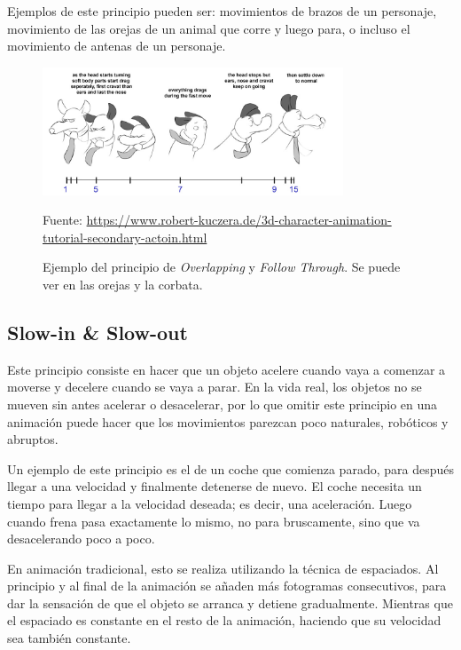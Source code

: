 \documentclass{article}
\begin{document}
\bigskip

Ejemplos de este principio pueden ser: movimientos de brazos de un personaje, movimiento de las orejas de un animal que corre y luego para, o incluso el movimiento de antenas de un personaje.

\begin{figure}[H]
    \centering
    \includegraphics[width=0.8\textwidth]{imagenes/overlap-08.jpg}
    \caption{Ejemplo del principio de \textit{Overlapping} y \textit{Follow Through}. Se puede ver en las orejas y la corbata.}
    \vspace{10pt}
    \footnotesize{Fuente: \url{https://www.robert-kuczera.de/3d-character-animation-tutorial-secondary-actoin.html}}
\end{figure}

\subsection{Slow-in \& Slow-out}

Este principio consiste en hacer que un objeto acelere cuando vaya a comenzar a moverse y decelere cuando se vaya a parar. En la vida real, los objetos no se mueven sin antes acelerar o desacelerar, por lo que omitir este principio en una animación puede hacer que los movimientos parezcan poco naturales, robóticos y abruptos. \cite{plural}

\bigskip

Un ejemplo de este principio es el de un coche que comienza parado, para después llegar a una velocidad y finalmente detenerse de nuevo. El coche necesita un tiempo para llegar a la velocidad deseada; es decir, una aceleración. Luego cuando frena pasa exactamente lo mismo, no para bruscamente, sino que va desacelerando poco a poco. \cite{plural}

\bigskip

En animación tradicional, esto se realiza utilizando la técnica de espaciados. Al principio y al final de la animación se añaden más fotogramas consecutivos, para dar la sensación de que el objeto se arranca y detiene gradualmente. Mientras que el espaciado es constante en el resto de la animación, haciendo que su velocidad sea también constante.
\end{document}
